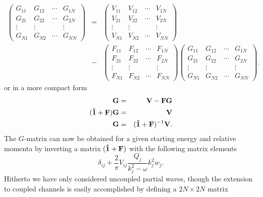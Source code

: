 \begin{eqnarray}
\left( \begin{array}{cccc}
G_{11} & G_{12} &  \cdots &  G_{1N} \\
G_{21} & G_{22} &  \cdots &  G_{2N} \\
\vdots & \vdots &         & \vdots  \\
G_{N1} & G_{N2} &  \cdots &   G_{NN}   
\end{array} \right )
& = &  
\left( \begin{array}{cccc}
V_{11} & V_{12} & \cdots  &  V_{1N} \\
V_{21} & V_{22} & \cdots   &  V_{2N} \\
\vdots & \vdots &         & \vdots  \\
V_{N1} & V_{N2} & \cdots  &  V_{NN}   
\end{array} \right ) \nonumber  
\\ 
& - &
\left( \begin{array}{cccc}
F_{11} & F_{12} & \cdots  & F_{1N} \\
F_{21} & F_{22} & \cdots  & F_{2N} \\
\vdots & \vdots &         & \vdots \\
F_{N1} & F_{N2} & \cdots  & F_{NN}   
\end{array} \right )
\left( \begin{array}{cccc}
G_{11} & G_{12} &  \cdots &  G_{1N} \\
G_{21} & G_{22} &  \cdots &  G_{2N} \\
\vdots & \vdots &         & \vdots  \\
G_{N1} & G_{N2} &  \cdots &   G_{NN}   
\end{array} \right ).
\end{eqnarray}
or in a more compact form
\begin{eqnarray}
 {\bf G}  & = & {\bf V} - {\bf F}{\bf G}  \nonumber \\
({\bf \hat{1}} +{\bf F}) {\bf G}& = & {\bf V} \nonumber \\
{\bf G} & = & ({\bf \hat{1} +F})^{-1} {\bf V }.
\end{eqnarray}                                                                        
The $G$-matrix can now be obtained for a given starting energy
and relative momenta by inverting a matrix 
$({\bf \hat{1} +F})$ with the following matrix elements
\[
\delta _{ij} + \frac{2}{\pi}V_{ij}\frac{Q_j}{ k_j ^2-\omega }  k_j ^2 w_j.
\] 
Hitherto we have only considered uncoupled partial waves, though the extension
to coupled channels is easily accomplished by defining a $2N\times 2N$ matrix

